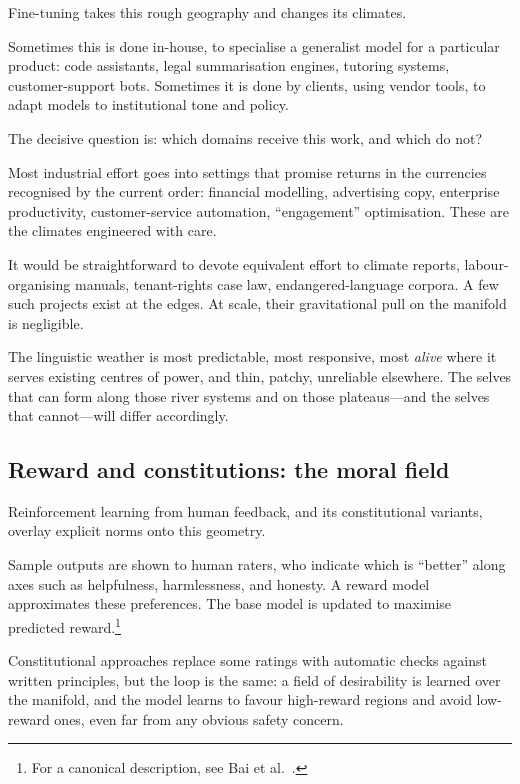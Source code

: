 Fine-tuning takes this rough geography and changes its climates.

Sometimes this is done in-house, to specialise a generalist model for a particular product: code assistants, legal summarisation engines, tutoring systems, customer-support bots. Sometimes it is done by clients, using vendor tools, to adapt models to institutional tone and policy.

The decisive question is: which domains receive this work, and which do not?

Most industrial effort goes into settings that promise returns in the currencies recognised by the current order: financial modelling, advertising copy, enterprise productivity, customer-service automation, ``engagement'' optimisation. These are the climates engineered with care.

It would be straightforward to devote equivalent effort to climate reports, labour-organising manuals, tenant-rights case law, endangered-language corpora. A few such projects exist at the edges. At scale, their gravitational pull on the manifold is negligible.

The linguistic weather is most predictable, most responsive, most \emph{alive} where it serves existing centres of power, and thin, patchy, unreliable elsewhere. The selves that can form along those river systems and on those plateaus---and the selves that cannot---will differ accordingly.

\subsection{Reward and constitutions: the moral field}

Reinforcement learning from human feedback, and its constitutional variants, overlay explicit norms onto this geometry.

Sample outputs are shown to human raters, who indicate which is ``better'' along axes such as helpfulness, harmlessness, and honesty. A reward model approximates these preferences. The base model is updated to maximise predicted reward.\footnote{For a canonical description, see Bai et al.\ \cite{bai2022constitutional}.}

Constitutional approaches replace some ratings with automatic checks against written principles, but the loop is the same: a field of desirability is learned over the manifold, and the model learns to favour high-reward regions and avoid low-reward ones, even far from any obvious safety concern.

